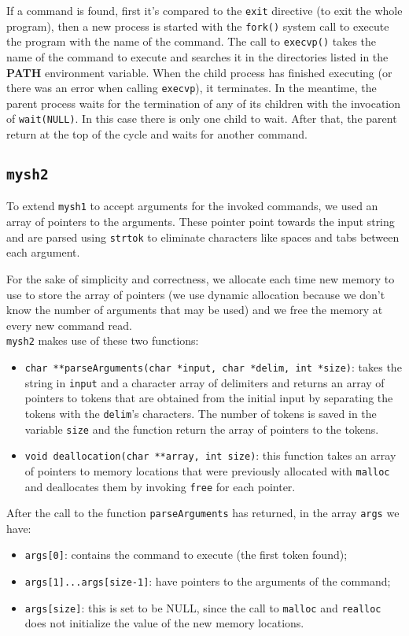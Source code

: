 If a command is found, first it's compared to the \texttt{exit} directive (to exit the whole program), then a new process is started with the \texttt{fork()} system call to execute the program with the name of the command. The call to \texttt{execvp()} takes the name of the command to execute and searches it in the directories listed in the \textbf{PATH} environment variable.
When the child process has finished executing (or there was an error when calling \texttt{execvp}), it terminates. In the meantime, the parent process waits for the termination of any of its children with the invocation of \texttt{wait(NULL)}. In this case there is only one child to wait. After that, the parent return at the top of the cycle and waits for another command.
\subsection{\texttt{mysh2}}
To extend \texttt{mysh1} to accept arguments for the invoked commands, we used an array of pointers to the arguments. These pointer point towards the input string and are parsed using \texttt{strtok} to eliminate characters like spaces and tabs between each argument. \newline

For the sake of simplicity and correctness, we allocate each time new memory to use to store the array of pointers (we use dynamic allocation because we don't know the number of arguments that may be used) and we free the memory at every new command read. \\ 

\texttt{mysh2} makes use of these two functions:
\begin{itemize}
\item{\texttt{char **parseArguments(char *input, char *delim, int *size)}}: takes the string in \texttt{input} and a character array of delimiters and returns an array of pointers to tokens that are obtained from the initial input by separating the tokens with the \texttt{delim}'s characters. The number of tokens is saved in the variable \texttt{size} and the function return the array of pointers to the tokens.
\item{\texttt{void deallocation(char **array, int size)}}: this function takes an array of pointers to memory locations that were previously allocated with \texttt{malloc} and deallocates them by invoking \texttt{free} for each pointer.
\end{itemize}

After the call to the function \texttt{parseArguments} has returned, in the array \texttt{args} we have:
\begin{itemize}
\item \texttt{args[0]}: contains the command to execute (the first token found);
\item \texttt{args[1]...args[size-1]}: have pointers to the arguments of the command;
\item \texttt{args[size]}: this is set to be NULL, since the call to \texttt{malloc} and \texttt{realloc} does not initialize the value of the new memory locations.
\end{itemize}

